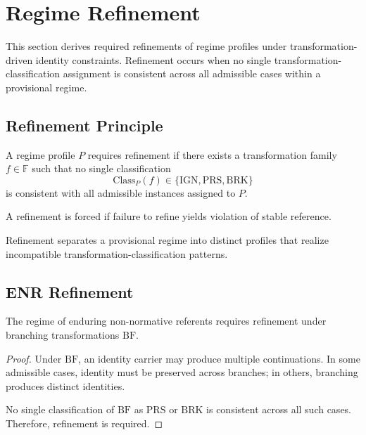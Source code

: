 
\section{Regime Refinement}
\label{sec:refinement}

This section derives required refinements of regime profiles
under transformation-driven identity constraints.
Refinement occurs when no single transformation-classification assignment
is consistent across all admissible cases within a provisional regime.

\subsection{Refinement Principle}

\begin{definition}
\label{def:refinement_condition}
A regime profile $P$ requires refinement if there exists a transformation family
$f \in \mathbb{F}$ such that no single classification
\[
\mathrm{Class}_P(f) \in \{ \mathrm{IGN}, \mathrm{PRS}, \mathrm{BRK} \}
\]
is consistent with all admissible instances assigned to $P$.
\end{definition}

\begin{definition}
\label{def:forced_refinement}
A refinement is forced if failure to refine yields violation
of stable reference.
\end{definition}


Refinement separates a provisional regime into distinct profiles
that realize incompatible transformation-classification patterns.


\subsection{ENR Refinement}

\begin{proposition}
\label{prop:enr_split}
The regime of enduring non-normative referents requires refinement
under branching transformations $\mathrm{BF}$.
\end{proposition}

\begin{proof}
Under $\mathrm{BF}$, an identity carrier may produce multiple continuations.
In some admissible cases, identity must be preserved across branches;
in others, branching produces distinct identities.

No single classification of $\mathrm{BF}$ as $\mathrm{PRS}$ or $\mathrm{BRK}$
is consistent across all such cases.
Therefore, refinement is required.
\end{proof}

